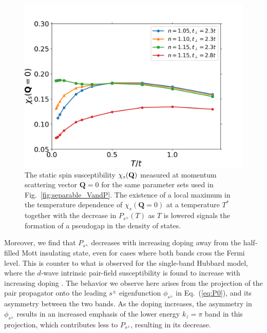 \documentclass[prb,twocolumn,amsmath,amssymb,superscriptaddress,floatfix,nofootinbib]{revtex4-2}
\begin{document}
\begin{figure}[t]
\centering
\includegraphics[scale=0.4]{suscept_q000.png}
\caption{The static spin susceptibility $\chi_s({\bf Q})$ measured at momentum scattering vector $\mathbf{Q}=0$ for the same parameter sets used in Fig.~\ref{fig:separable_VandP}. The existence of a local maximum in the temperature dependence of $\chi_s(\mathbf{Q}=0)$ at a temperature $T^*$ together with the decrease in $P_{s^\pm}(T)$ as $T$ is lowered  signals the formation of a pseudogap in the density of states.}
\label{fig:spinsusQ0}
\end{figure}

Moreover, we find that $P_{s^\pm}$ decreases with increasing doping away from the half-filled Mott insulating state, even for cases where both bands cross the Fermi level. This is counter to what is observed for the single-band Hubbard model, where the $d$-wave intrinsic pair-field susceptibility is found to increase with increasing doping \cite{Maier2016, Maier2018}. The behavior we observe here arises from the projection of the pair propagator onto the leading $s^\pm$ eigenfunction $\phi_{s^\pm}$ in Eq.~(\ref{eq:P0}), and its asymmetry between the two bands. As the doping increases, the asymmetry in $\phi_{s^\pm}$ results in an increased emphasis of the lower energy $k_z = \pi$ band in this projection, which contributes less to $P_{s^\pm}$, resulting in its decrease.
\end{document}
